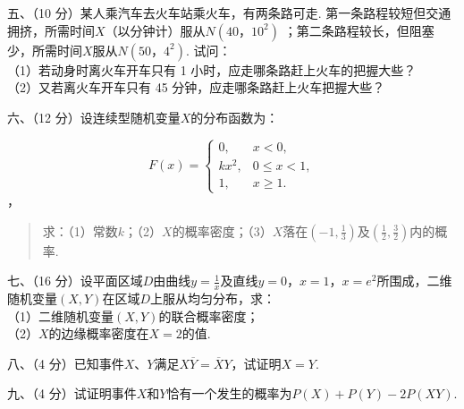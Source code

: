 \documentclass[fontset=exam]{exam-zh}
\begin{document}

五、（10 分）某人乘汽车去火车站乘火车，有两条路可走. 第一条路程较短但交通拥挤，所需时间\(X\)（以分钟计）服从\(N(40\text{，}\allowbreak 10^{2})\) ；第二条路程较长，但阻塞少，所需时间\(X\)服从\(N(50\text{，}\allowbreak 4^{2})\). 试问：\\
（1）若动身时离火车开车只有 1 小时，应走哪条路赶上火车的把握大些？\\
（2）又若离火车开车只有 45 分钟，应走哪条路赶上火车把握大些？


六、（12 分）设连续型随机变量\(X\)的分布函数为：

\[F(x)=\begin{cases}0,&x<0,\\kx^2,&0\le x<1,\\1,&x\ge1.\end{cases}\]，

\begin{quote}
求：（1）常数\(k\)；（2）\(X\)的概率密度；（3）\(X\)落在\(( - 1,\frac{1}{3})\)及\((\frac{1}{2},\frac{3}{2})\)内的概率.
\end{quote}


七、（16 分）设平面区域\(D\)由曲线\(y = \frac{1}{x}\)及直线\(y = 0\text{，}\allowbreak x = 1\text{，}\allowbreak x = e^{2}\)所围成，二维随机变量\((X,Y)\)在区域\(D\)上服从均匀分布，求：\\
（1）二维随机变量\((X,Y)\)的联合概率密度；\\
（2）\(X\)的边缘概率密度在\(X = 2\)的值.


八、（4 分）已知事件\(X\text{、}Y\)满足\(X\overline{Y} = \overline{X}Y\)，试证明\(X = Y\).


九、（4 分）试证明事件\(X\)和\(Y\)恰有一个发生的概率为\(P(X) + P(Y) - 2P(XY)\).
\end{document}
